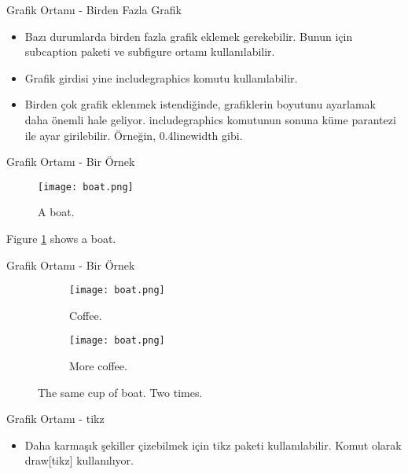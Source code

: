 \documentclass[pdf]{beamer}
\begin{document}
\begin{frame}{Grafik Ortamı - Birden Fazla Grafik}
\begin{itemize}
	\item Bazı durumlarda birden fazla grafik eklemek gerekebilir. Bunun için subcaption paketi ve subfigure ortamı kullanılabilir.
	\item Grafik girdisi yine includegraphics komutu kullanılabilir.
	\item Birden çok grafik eklenmek istendiğinde, grafiklerin boyutunu ayarlamak daha önemli hale geliyor. includegraphics komutunun sonuna küme parantezi ile ayar girilebilir. Örneğin, 0.4linewidth gibi.
\end{itemize}
\end{frame}

\begin{frame}{Grafik Ortamı - Bir Örnek}
\begin{figure}
	\texttt{[image: boat.png]}
	\caption{A boat.}
	\label{fig:boat1}
\end{figure}

Figure \ref{fig:boat1} shows a boat.
\end{frame}

\begin{frame}{Grafik Ortamı - Bir Örnek}
\begin{figure}[h!]
	\centering
	\begin{subfigure}[b]{0.4\linewidth}
		\texttt{[image: boat.png]}
		\caption{Coffee.}
	\end{subfigure}
	\begin{subfigure}[b]{0.4\linewidth}
		\texttt{[image: boat.png]}
		\caption{More coffee.}
	\end{subfigure}
	\caption{The same cup of boat. Two times.}
	\label{fig:boat2}
\end{figure}
\end{frame}

\begin{frame}{Grafik Ortamı - tikz}
\begin{itemize}
	\item Daha karmaşık şekiller çizebilmek için tikz paketi kullanılabilir. Komut olarak draw[tikz] kullanılıyor.
\end{itemize}
\end{frame}
\end{document}
